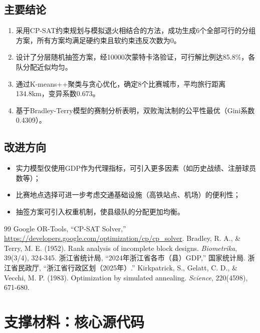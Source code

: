 \documentclass[a4paper,12pt]{article}
\begin{document}
\subsection{主要结论}
\begin{enumerate}
    \item 采用CP-SAT约束规划与模拟退火相结合的方法，成功生成6个全部可行的分组方案，所有方案均满足硬约束且软约束违反次数为0。
    \item 设计了分层随机抽签方案，经10000次蒙特卡洛验证，可行解比例达85.8\%，各队分配近似均匀。
    \item 通过K-means++聚类与贪心优化，确定8个比赛城市，平均旅行距离134.8km，变异系数0.673。
    \item 基于Bradley-Terry模型的赛制分析表明，双败淘汰制的公平性最优（Gini系数0.4309）。
\end{enumerate}

\subsection{改进方向}
\begin{itemize}
    \item 实力模型仅使用GDP作为代理指标，可引入更多因素（如历史战绩、注册球员数等）；
    \item 比赛地点选择可进一步考虑交通基础设施（高铁站点、机场）的便利性；
    \item 抽签方案可引入权重机制，使县级队的分配更加均衡。
\end{itemize}

\begin{thebibliography}{99}
 Google OR-Tools, ``CP-SAT Solver,'' \url{https://developers.google.com/optimization/cp/cp_solver}.
 Bradley, R. A., \& Terry, M. E. (1952). Rank analysis of incomplete block designs. \textit{Biometrika}, 39(3/4), 324-345.
 浙江省统计局, ``2024年浙江省各市（县）GDP,'' 国家统计局.
 浙江省民政厅, ``浙江省行政区划（2025年）.''
 Kirkpatrick, S., Gelatt, C. D., \& Vecchi, M. P. (1983). Optimization by simulated annealing. \textit{Science}, 220(4598), 671-680.
\end{thebibliography}

\appendix
\section{支撑材料：核心源代码}



\end{document}
